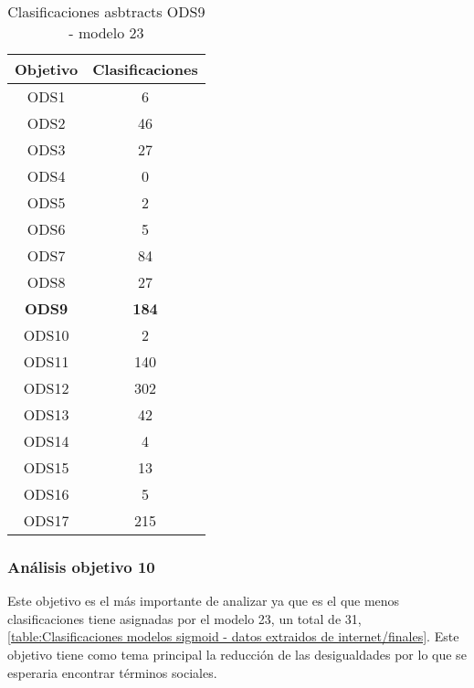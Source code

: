 \begin{table}[H]
    \begin{tabular}{| c | c |}
        \hline
        Objetivo & Clasificaciones \\
        \hline \hline
        ODS1   & 6   \\ \hline
        ODS2   & 46  \\ \hline
        ODS3   & 27  \\ \hline
        ODS4   & 0   \\ \hline
        ODS5   & 2   \\ \hline
        ODS6   & 5   \\ \hline
        ODS7   & 84  \\ \hline
        ODS8   & 27  \\ \hline
        \textbf{ODS9}   & \textbf{184} \\ \hline
        ODS10  & 2   \\ \hline
        ODS11  & 140 \\ \hline
        ODS12  & 302 \\ \hline
        ODS13  & 42  \\ \hline
        ODS14  & 4   \\ \hline
        ODS15  & 13  \\ \hline
        ODS16  & 5   \\ \hline
        ODS17  & 215 \\ \hline
    \end{tabular}
    \caption{Clasificaciones asbtracts ODS9 - modelo 23}
    \label{table:Clasificaciones asbtracts ODS9 - modelo 23}
\end{table}


\subsubsection{Análisis objetivo 10}
Este objetivo es el más importante de analizar ya que es el que menos
clasificaciones tiene asignadas por el modelo 23, un total de 31,
\cref{table:Clasificaciones modelos sigmoid - datos extraidos de
internet/finales}. Este objetivo tiene como tema principal la reducción de las
desigualdades por lo que se esperaria encontrar términos sociales. 

